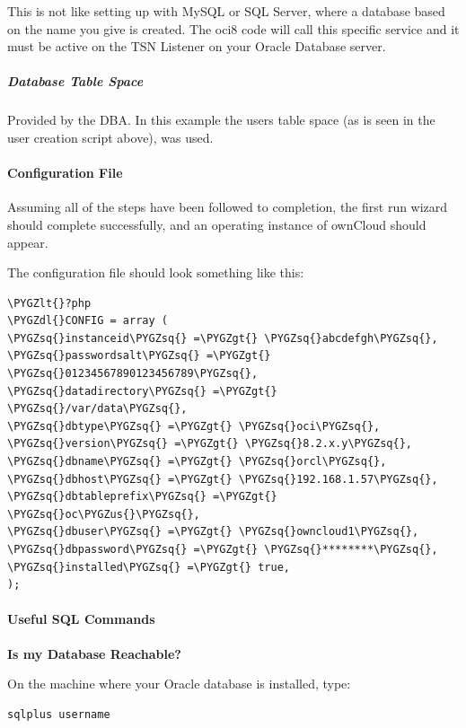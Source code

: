 \documentclass[letterpaper,10pt,english]{sphinxmanual}
\def\PYGZus{\char`\_}
\def\PYGZlt{\char`\<}
\def\PYGZgt{\char`\>}
\def\PYGZdl{\char`\$}
\def\PYGZsq{\char`\'}
\renewcommand\PYGZsq{\textquotesingle}
\begin{document}
This is not like setting up with MySQL or SQL Server, where a database based on the name you give is created.
The oci8 code will call this specific service and it must be active on the TSN Listener on your Oracle Database server.


\subparagraph{Database Table Space}
\label{enterprise_installation/oracle_db_configuration:database-table-space}
Provided by the DBA.
In this example the users table space (as is seen in the user creation script above), was used.


\paragraph{Configuration File}
\label{enterprise_installation/oracle_db_configuration:configuration-file}
Assuming all of the steps have been followed to completion, the first run wizard should complete successfully, and an operating instance of ownCloud should appear.

The configuration file should look something like this:

\begin{Verbatim}[commandchars=\\\{\}]
\PYGZlt{}?php
\PYGZdl{}CONFIG = array (
\PYGZsq{}instanceid\PYGZsq{} =\PYGZgt{} \PYGZsq{}abcdefgh\PYGZsq{},
\PYGZsq{}passwordsalt\PYGZsq{} =\PYGZgt{} \PYGZsq{}01234567890123456789\PYGZsq{},
\PYGZsq{}datadirectory\PYGZsq{} =\PYGZgt{} \PYGZsq{}/var/data\PYGZsq{},
\PYGZsq{}dbtype\PYGZsq{} =\PYGZgt{} \PYGZsq{}oci\PYGZsq{},
\PYGZsq{}version\PYGZsq{} =\PYGZgt{} \PYGZsq{}8.2.x.y\PYGZsq{},
\PYGZsq{}dbname\PYGZsq{} =\PYGZgt{} \PYGZsq{}orcl\PYGZsq{},
\PYGZsq{}dbhost\PYGZsq{} =\PYGZgt{} \PYGZsq{}192.168.1.57\PYGZsq{},
\PYGZsq{}dbtableprefix\PYGZsq{} =\PYGZgt{} \PYGZsq{}oc\PYGZus{}\PYGZsq{},
\PYGZsq{}dbuser\PYGZsq{} =\PYGZgt{} \PYGZsq{}owncloud1\PYGZsq{},
\PYGZsq{}dbpassword\PYGZsq{} =\PYGZgt{} \PYGZsq{}********\PYGZsq{},
\PYGZsq{}installed\PYGZsq{} =\PYGZgt{} true,
);
\end{Verbatim}


\paragraph{Useful SQL Commands}
\label{enterprise_installation/oracle_db_configuration:useful-sql-commands}
\textbf{Is my Database Reachable?}

On the machine where your Oracle database is installed, type:

\begin{Verbatim}[commandchars=\\\{\}]
sqlplus username
\end{Verbatim}
\end{document}
